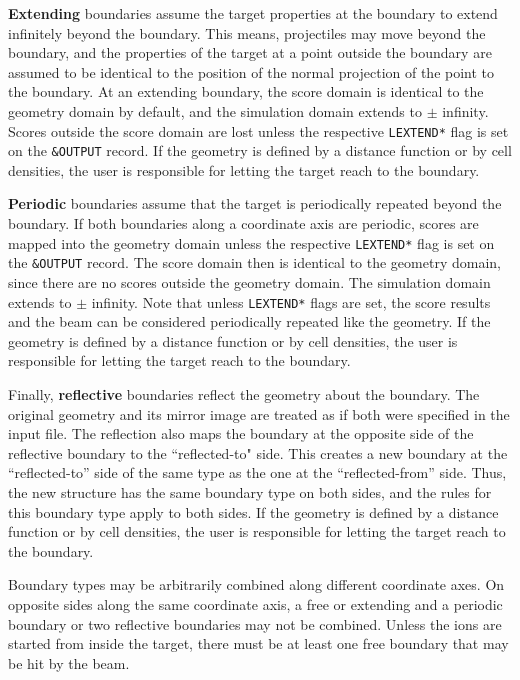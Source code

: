 \textbf{Extending} boundaries assume the target properties at the boundary
to extend infinitely beyond the boundary. 
This means, projectiles may move beyond the boundary, and the properties of 
the target at a point outside the boundary are assumed to be identical to 
the position of the normal projection of the point to the boundary. 
At an extending boundary, the score domain is identical to the geometry domain 
by default, and the simulation domain extends to $\pm$ infinity. 
Scores outside the score domain are lost unless the respective 
\texttt{LEXTEND*} flag is set on the \texttt{\&OUTPUT} record.
If the geometry is defined by a distance function or by cell densities, the 
user is responsible for letting the target reach to the boundary.  

\textbf{Periodic} boundaries assume that the target is periodically repeated 
beyond the boundary. 
If both boundaries along a coordinate axis are periodic, scores are mapped 
into the geometry domain unless the respective \texttt{LEXTEND*} flag is set 
on the \texttt{\&OUTPUT} record. 
The score domain then is identical to the geometry domain, since there are no 
scores outside the geometry domain. 
The simulation domain extends to $\pm$ infinity. 
Note that unless \texttt{LEXTEND*} flags are set, the score results and the
beam can be considered periodically repeated like the geometry.
If the geometry is defined by a distance function or by cell densities, the 
user is responsible for letting the target reach to the boundary.  

Finally, \textbf{reflective} boundaries reflect the geometry about the 
boundary. 
The original geometry and its mirror image are treated as if both
were specified in the input file.
The reflection also maps the boundary at the opposite side of the 
reflective boundary to the ``reflected-to" side.
This creates a new boundary at the ``reflected-to'' side of the same type
as the one at the ``reflected-from'' side.
Thus, the new structure has the same boundary type on both sides, and the 
rules for this boundary type apply to both sides.
If the geometry is defined by a distance function or by cell densities, the 
user is responsible for letting the target reach to the boundary.  

Boundary types may be arbitrarily combined along different coordinate axes. 
On opposite sides along the same coordinate axis, a free or extending and 
a periodic boundary or two reflective boundaries may not be combined.
Unless the ions are started from inside the target, there must be at least 
one free boundary that may be hit by the beam.   

